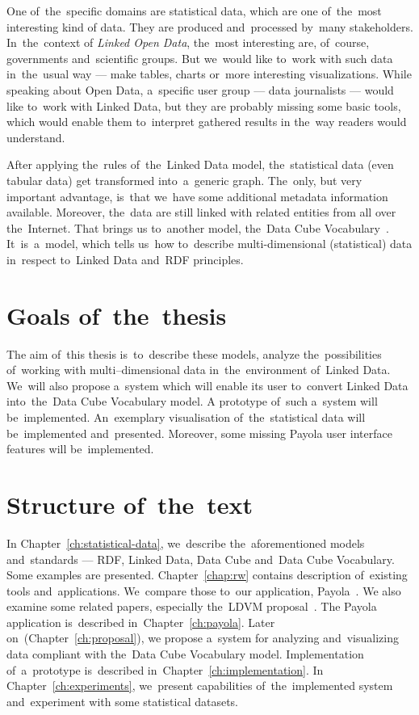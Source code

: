 One of~the~specific domains are statistical data, which are one of~the~most interesting kind
of data. They are produced and~processed by~many stakeholders. In~the~context of
\emph{Linked Open Data}, the~most interesting are, of~course, governments and~scientific groups.
But we~would like to~work with such data in~the~usual
way --- make tables, charts or~more interesting visualizations. While speaking about Open Data, a~specific
user group --- data journalists --- would like to~work with Linked Data, but they are probably
missing some basic tools, which would enable them to~interpret gathered results
in the~way readers would understand.

After applying the~rules of~the~Linked Data model, the~statistical data (even tabular data)
get transformed into~a~generic graph. The~only, but very important advantage, is~that we~have some additional
metadata information available. Moreover, the~data are still linked with related entities from all over the~Internet.
That brings
us to~another model, the~Data Cube Vocabulary~\cite{dcv}. It~is~a~model, which tells us~how to~describe
multi-dimensional (statistical) data in~respect to~Linked Data and~RDF 
principles.

\section*{Goals of~the~thesis}

The aim of~this thesis is~to~describe these models, analyze the~possibilities of~working
with multi--dimensional data in~the~environment of~Linked Data. We~will also propose a~system
which will enable its user to~convert Linked Data into~the~Data Cube Vocabulary model.
A prototype of~such a~system will be~implemented. An~exemplary visualisation of~the~statistical
data will be~implemented and~presented. Moreover, some missing Payola user interface features 
will be~implemented.

\section*{Structure of~the~text}
In Chapter~\ref{ch:statistical-data}, we~describe the~aforementioned 
models and~standards --- RDF, Linked Data, Data Cube and~Data Cube Vocabulary. 
Some examples are presented. Chapter~\ref{chap:rw} contains description of~existing tools and~applications. We~compare those to~our application, Payola~\cite{payola}.
We also examine some related papers, especially the~LDVM proposal~\cite{ldvm}. 
The Payola application is~described in~Chapter~\ref{ch:payola}. Later on~(Chapter~\ref{ch:proposal}),
we propose a~system
for analyzing and~visualizing data compliant with the~Data Cube Vocabulary model.
Implementation of~a~prototype is~described in~Chapter~\ref{ch:implementation}.
In Chapter~\ref{ch:experiments}, we~present capabilities of~the~implemented system
and~experiment with some statistical datasets.